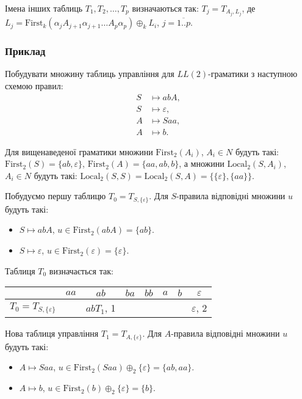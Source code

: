 Імена інших таблиць $T_1, T_2, \ldots, T_p$ визначаються так: $T_j = T_{A_j, L_j}$, де $L_j = \text{First}_k(\alpha_j A_{j + 1} \alpha_{j + 1} \ldots A_p \alpha_p) \oplus_k L_i$, $j = \overline{1..p}$.

\subsubsection{Приклад}

Побудувати множину таблиць управління для $LL(2)$-граматики з наступною схемою правил:
\setcounter{equation}{0}
\begin{align}
	S &\mapsto abA, \\
	S &\mapsto \varepsilon, \\
	A &\mapsto Saa, \\
	A &\mapsto b.
\end{align}

Для вищенаведеної граматики множини $\text{First}_2(A_i)$, $A_i \in N$ будуть такі: $\text{First}_2(S) = \{ab, \varepsilon\}$, $\text{First}_2(A) = \{aa, ab, b\}$, а множини $\text{Local}_2(S, A_i)$, $A_i \in N$ будуть такі: $\text{Local}_2(S, S) = \text{Local}_2(S, A) = \{\{\varepsilon\}, \{aa\}\}$. \medskip

Побудуємо першу таблицю $T_0 = T_{S, \{\varepsilon\}}$. Для $S$-правила відповідні множини $u$ будуть такі:
\begin{itemize}
	\item $S \mapsto abA$, $u \in \text{First}_2(abA) = \{ab\}$.
	\item $S \mapsto \varepsilon$, $u \in \text{First}_2(\varepsilon) = \{\varepsilon\}$.
\end{itemize}

Таблиця $T_0$ визначається так:
\begin{table}[H]
	\centering
	\begin{tabular}{|c|c|c|c|c|c|c|c|}
		\hline
		& $aa$ & $ab$ & $ba$ & $bb$ & $a$ & $b$ & $\varepsilon$ \\ \hline
		$T_0 = T_{S, \{\varepsilon\}}$ &  & $abT_1$, 1 &  &  &  &  & $\varepsilon$, 2 \\ \hline
	\end{tabular}
\end{table}

Нова таблиця управління $T_1 = T_{A, \{\varepsilon\}}$. Для $A$-правила відповідні множини $u$ будуть такі:
\begin{itemize}
	\item $A \mapsto Saa$, $u \in \text{First}_2(Saa) \oplus_2 \{\varepsilon\} = \{ab, aa\}$.
	\item $A \mapsto b$, $u \in \text{First}_2(b) \oplus_2 \{\varepsilon\} = \{b\}$.
\end{itemize}

